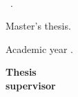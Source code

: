 

\thispagestyle{empty}

\begin{center}
  \large  


  \begingroup
  \huge{\miTitulo} \\
  \bigskip
  
  \endgroup

  \textrm{\miNombre}


\end{center}  

\newpage
\thispagestyle{empty}

\hfill

\vfill

\miNombre\ \textit{\miTitulo}.

Master's thesis.

Academic year \miCurso.\\

\begin{minipage}[t]{0.25\textwidth}
  \flushleft
  \textbf{Thesis\\ supervisor}
\end{minipage}
\begin{minipage}[t]{0.40\textwidth}
  \flushleft
  \miTutor
\end{minipage}
\begin{minipage}[t]{0.35\textwidth}
  \flushright
  \miGrado
  \medskip

  \miUniversidad
\end{minipage}
\begin{flushleft}
\end{flushleft}

\endinput
